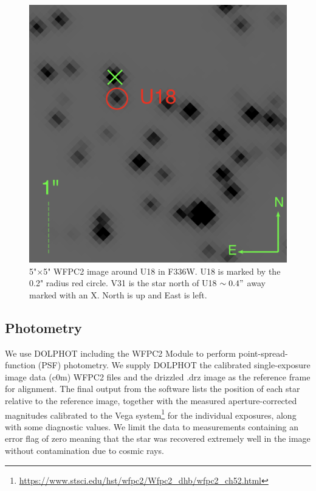 \documentclass[fleqn,usenatbib,useAMS,letters]{mnras}
\begin{document}
 \begin{figure}
	\includegraphics[width= \columnwidth]{hstds9.png}
    \caption{5"$\times$5" WFPC2 image around U18 in F336W. U18 is marked by the 0.2" radius red circle. V31 is the star north of U18 $\sim 0.4"$ away marked with an X. North is up and East is left.}
    \label{fig:u18}
\end{figure}



 \subsection{Photometry}
 
 We use DOLPHOT \citep{2000PASP..112.1383D} including the WFPC2 Module to perform point-spread-function (PSF) photometry. We supply DOLPHOT the calibrated single-exposure image data (c0m) WFPC2 files and the drizzled .drz image as the reference frame for alignment. The final output from the software lists the position of each star relative to the reference image, together with the measured aperture-corrected magnitudes calibrated to the Vega system\footnote{\url{https://www.stsci.edu/hst/wfpc2/Wfpc2\_dhb/wfpc2\_ch52.html}} for the individual exposures, along with some diagnostic values. We limit the data to measurements containing an error flag of zero meaning that the star was recovered extremely well in the image without contamination due to cosmic rays.
\end{document}
